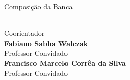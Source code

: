 \begin{folhadeaprovacao}

  \begin{center}
    {\ABNTEXchapterfont\large\imprimirautor}

    \vspace*{\fill}\vspace*{\fill}
    \begin{center}
      \ABNTEXchapterfont\bfseries\Large\imprimirtitulo
    \end{center}
    \vspace*{\fill}

    \hspace{.45\textwidth}
    \begin{minipage}{.5\textwidth}
        \imprimirpreambulo
    \end{minipage}%
    \vspace*{\fill}

    Composição da Banca
   \end{center}

   \begin{center}
   {\textbf{\imprimircoorientador} \\ Coorientador\\\vspace*{0.5cm}}
   {\textbf{Fabiano Sabha Walczak} \\ Professor Convidado\\\vspace*{0.5cm}}
   {\textbf{Francisco Marcelo Corrêa da Silva} \\ Professor Convidado\\\vspace*{0.5cm}}
\end{center}   
   \begin{center}
    \vspace*{0.5cm}
    {\large\imprimirlocal}
    \par
    {\large\imprimirdata}
    \vspace*{1cm}
  \end{center}

\end{folhadeaprovacao}